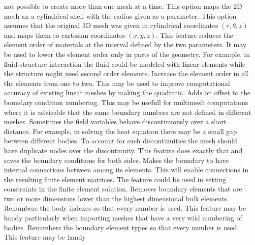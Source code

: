 not possible to create more than one mesh at a time.
%
This option maps the 2D mesh an a cylindrical shell with the radius
given as a parameter.
%
This option assumes that the original 3D mesh was given in 
cylindrical coordinates $(r,\theta,z)$ and maps them to cartesian 
coordinates $(x,y,z)$.
%
This feature reduces the element order of materials at the interval
defined by the two parameters. It may be used to lower the element order 
only in parts of the geometry. For example, in fluid-structure-interaction the 
fluid could be modeled with linear elements while the 
structure might need second order elements.
%
Increase the element order in all the elements from one to two.
This may be used to improve computational accuracy of existing 
linear meshes by making the quadratic.
%
%
Adds on offset to the boundary condition numbering. This may be usefull for multimesh
computations where it is advisable that the same boundary numbers are not defined in 
different meshes. 
%
Sometimes the field variables behave discontinuously over a short distance.
For example, in solving the heat equation there may be a small gap between
different bodies. To account for such discontinuities the mesh should
have duplicate nodes over the discontinuity. This feature does exactly that
and saves the boundary conditions for both sides.
%
Makes the boundary to have internal connections between among its elements. This
will enable connections in the resulting finite element matrices. The feature could 
be used in setting constraints in the finite element solution. 
%
Removes boundary elements that are two or more dimensions lower than the 
highest dimensional bulk elements. 
%
Renumbers the body indexes so that every number is used. This feature may be handy 
particularly when importing meshes that have a very wild numbering of bodies.
%
Renumbers the boundary element types so that every number is used. This feature may be handy 
